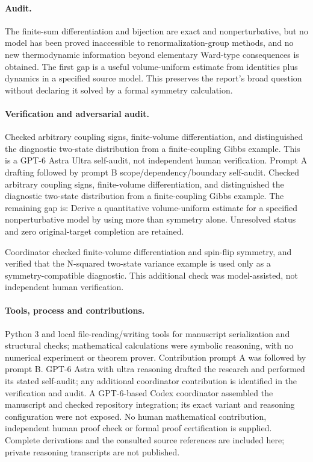 \documentclass[11pt]{article}
\begin{document}
\paragraph{Audit.} The finite-sum differentiation and bijection are exact and nonperturbative, but no model has been proved inaccessible to renormalization-group methods, and no new thermodynamic information beyond elementary Ward-type consequences is obtained. The first gap is a useful volume-uniform estimate from identities plus dynamics in a specified source model. This preserves the report's broad question without declaring it solved by a formal symmetry calculation.

\paragraph{Verification and adversarial audit.}
Checked arbitrary coupling signs, finite-volume differentiation, and distinguished the diagnostic two-state distribution from a finite-coupling Gibbs example. This is a GPT-6 Astra Ultra self-audit, not independent human verification. Prompt A drafting followed by prompt B scope/dependency/boundary self-audit. Checked arbitrary coupling signs, finite-volume differentiation, and distinguished the diagnostic two-state distribution from a finite-coupling Gibbs example. The remaining gap is: Derive a quantitative volume-uniform estimate for a specified nonperturbative model by using more than symmetry alone. Unresolved status and zero original-target completion are retained.

Coordinator checked finite-volume differentiation and spin-flip symmetry, and verified that the N-squared two-state variance example is used only as a symmetry-compatible diagnostic. This additional check was model-assisted, not independent human verification.

\paragraph{Tools, process and contributions.}
Python 3 and local file-reading/writing tools for manuscript serialization and structural checks; mathematical calculations were symbolic reasoning, with no numerical experiment or theorem prover. Contribution prompt A was followed by prompt B. GPT-6 Astra with ultra reasoning drafted the research and performed its stated self-audit; any additional coordinator contribution is identified in the verification and audit. A GPT-6-based Codex coordinator assembled the manuscript and checked repository integration; its exact variant and reasoning configuration were not exposed. No human mathematical contribution, independent human proof check or formal proof certification is supplied. Complete derivations and the consulted source references are included here; private reasoning transcripts are not published.
\end{document}
